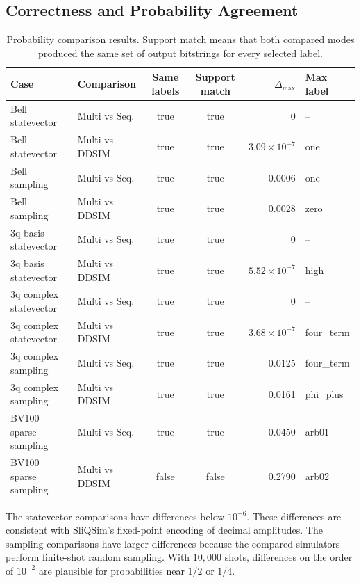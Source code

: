 \documentclass[sigconf,nonacm]{acmart}
\begin{document}
\subsection{Correctness and Probability Agreement}
\begin{table}[t]
\centering
\caption{Probability comparison results. Support match means that both compared modes produced the same set of output bitstrings for every selected label.}
\label{tab:probability}
\begin{tabular}{llccrl}
\toprule
Case & Comparison & Same labels & Support match & $\Delta_{\max}$ & Max label \\
\midrule
Bell statevector & Multi vs Seq. & true & true & 0 & -- \\
Bell statevector & Multi vs DDSIM & true & true & $3.09\times10^{-7}$ & one \\
\midrule
Bell sampling & Multi vs Seq. & true & true & 0.0006 & one \\
Bell sampling & Multi vs DDSIM & true & true & 0.0028 & zero \\
\midrule
3q basis statevector & Multi vs Seq. & true & true & 0 & -- \\
3q basis statevector & Multi vs DDSIM & true & true & $5.52\times10^{-7}$ & high \\
\midrule
3q complex statevector & Multi vs Seq. & true & true & 0 & -- \\
3q complex statevector & Multi vs DDSIM & true & true & $3.68\times10^{-7}$ & four\_term \\
\midrule
3q complex sampling & Multi vs Seq. & true & true & 0.0125 & four\_term \\
3q complex sampling & Multi vs DDSIM & true & true & 0.0161 & phi\_plus \\
\midrule
BV100 sparse sampling & Multi vs Seq. & true & true & 0.0450 & arb01 \\
BV100 sparse sampling & Multi vs DDSIM & false & false & 0.2790 & arb02 \\
\bottomrule
\end{tabular}
\end{table}

The statevector comparisons have differences below $10^{-6}$. These differences are consistent with SliQSim's fixed-point encoding of decimal amplitudes. The sampling comparisons have larger differences because the compared simulators perform finite-shot random sampling. With $10{,}000$ shots, differences on the order of $10^{-2}$ are plausible for probabilities near $1/2$ or $1/4$.
\end{document}
